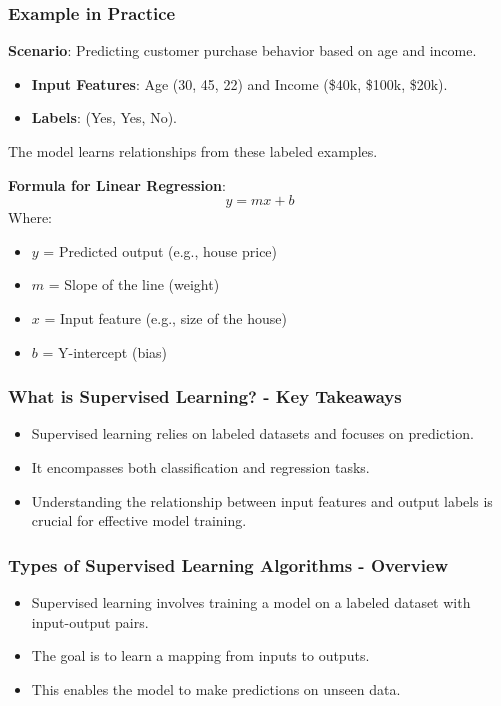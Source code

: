 \documentclass{beamer}
\begin{document}
\begin{frame}[fragile]
    \frametitle{Example in Practice}
    \textbf{Scenario}: Predicting customer purchase behavior based on age and income.
    
    \begin{itemize}
        \item \textbf{Input Features}: Age (30, 45, 22) and Income (\$40k, \$100k, \$20k).
        \item \textbf{Labels}: (Yes, Yes, No).
    \end{itemize}
    
    The model learns relationships from these labeled examples.

    \textbf{Formula for Linear Regression}:
    \begin{equation}
        y = mx + b
    \end{equation}
    Where:
    \begin{itemize}
        \item \( y \) = Predicted output (e.g., house price)
        \item \( m \) = Slope of the line (weight)
        \item \( x \) = Input feature (e.g., size of the house)
        \item \( b \) = Y-intercept (bias)
    \end{itemize}
\end{frame}

\begin{frame}[fragile]
    \frametitle{What is Supervised Learning? - Key Takeaways}
    \begin{itemize}
        \item Supervised learning relies on labeled datasets and focuses on prediction.
        \item It encompasses both classification and regression tasks.
        \item Understanding the relationship between input features and output labels is crucial for effective model training.
    \end{itemize}
\end{frame}

\begin{frame}[fragile]
    \frametitle{Types of Supervised Learning Algorithms - Overview}
    \begin{itemize}
        \item Supervised learning involves training a model on a labeled dataset with input-output pairs.
        \item The goal is to learn a mapping from inputs to outputs.
        \item This enables the model to make predictions on unseen data.
    \end{itemize}
\end{frame}
\end{document}
